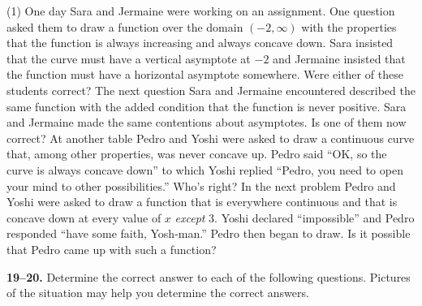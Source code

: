 \documentclass[10pt,oneside,]{book}
\theoremstyle{plain}
\theoremstyle{definition}
\numberwithin{equation}{section}
\newcommand{\ointerval}[2]{\left(#1,#2\right)}
\begin{document}
\begin{exercisegroup}(1)
\exercise[15.]\hypertarget{exercise-292}{\null}One day Sara and Jermaine were working on an assignment.  One question asked them to draw a function over the domain \(\ointerval{-2}{\infty}\) with the properties that the function is always increasing and always concave down.  Sara insisted that the curve must have a vertical asymptote at \(-2\) and Jermaine insisted that the function must have a horizontal asymptote somewhere.  Were either of these students correct?%
\exercise[16.]\hypertarget{exercise-293}{\null}The next question Sara and Jermaine encountered described the same function with the added condition that the function is never positive.  Sara and Jermaine made the same contentions about asymptotes.  Is one of them now correct?%
\exercise[17.]\hypertarget{exercise-294}{\null}At another table Pedro and Yoshi were asked to draw a continuous curve that, among other properties, was never concave up.  Pedro said ``OK, so the curve is always concave down'' to which Yoshi replied ``Pedro, you need to open your  mind to other possibilities.''  Who's right?%
\exercise[18.]\hypertarget{exercise-295}{\null}In the next problem Pedro and Yoshi were asked to draw a function that is everywhere continuous and that is concave down at every value of \(x\) \emph{except} \(3\).  Yoshi declared ``impossible'' and Pedro responded ``have some faith, Yosh-man.''  Pedro then began to draw. Is it possible that Pedro came up with such a function?%
\end{exercisegroup}
\par\smallskip\noindent
\textbf{19--20. }\hypertarget{exercisegroup-62}{\null}Determine the correct answer to each of the following questions.  Pictures of the situation may help you determine the correct answers.%
\par
\end{document}
